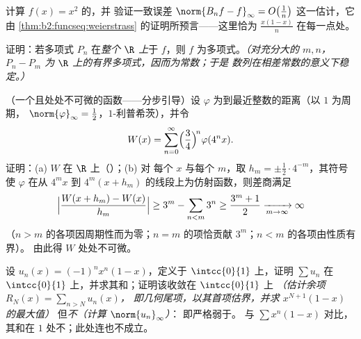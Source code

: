 \begin{exercise}[$\star\star$]\label{exo:b2:funcseq:7}
计算 $f(x) = x^2$ 的，并
验证一致误差 $\norm{B_n f - f}_\infty =
O\bigl(\frac1n\bigr)$ 这一估计，它由
\cref{thm:b2:funcseq:weierstrass} 的证明所预言——这里恰为 $\frac{x(1 -
x)}{n}$ 在每一点处。
\end{exercise}

\begin{exercise}[$\star\star$]\label{exo:b2:funcseq:8}
证明：若多项式 $P_n$ 在\emph{整个
$\R$ 上}于 $f$，则 $f$ 为多项式。\emph{（对充分大的 $m, n$，
$P_n - P_m$ 为 $\R$ 上的有界多项式，因而为常数；于是
数列在相差常数的意义下稳定。）}
\end{exercise}

\begin{exercise}[$\star\star\star$]\label{exo:b2:funcseq:9}
（一个且处处不可微的函数——分步引导）设
$\varphi$ 为到最近整数的距离（以 $1$ 为周期，
$\norm{\varphi}_\infty = \frac12$，$1$-利普希茨），并令
\[
W(x) = \sum_{n=0}^{\infty} \Bigl(\frac{3}{4}\Bigr)^{\!n}
\varphi(4^n x) .
\]
证明：(a) $W$ 在 $\R$ 上（）；(b) 对
每个 $x$ 与每个 $m$，取 $h_m = \pm\frac12\cdot 4^{-m}$，其符号
使 $\varphi$ 在从 $4^m x$
到 $4^m(x + h_m)$ 的线段上为仿射函数，则差商满足
\[
\Bigl|\frac{W(x + h_m) - W(x)}{h_m}\Bigr| \geq 3^m -
\sum_{n<m} 3^n \geq \frac{3^m + 1}{2} \xrightarrow[m\to\infty]{}
\infty
\]
（$n > m$ 的各项因周期性而为零；$n = m$ 的项恰贡献
$3^m$；$n < m$ 的各项由性质有界）。
由此得 $W$ 处处不可微。
\end{exercise}

\begin{exercise}[$\star$]\label{exo:b2:funcseq:10}
设 $u_n(x) = (-1)^n x^n(1 - x)$，定义于 $\intcc{0}{1}$ 上，证明
$\sum u_n$ 在 $\intcc{0}{1}$ 上，并求其和；证明该收敛在
$\intcc{0}{1}$ 上
\emph{（估计余项 $R_N(x) = \sum_{n > N} u_n(x)$，
即几何尾项，以其首项估界，并求 $x^{N+1}(1-x)$ 的最大值）}
但\emph{不}\emph{（计算 $\norm{u_n}_\infty$）}：
即严格弱于。
与 $\sum x^n(1-x)$ 对比，其和在
$1$ 处不；此处连也不成立。
\end{exercise}

